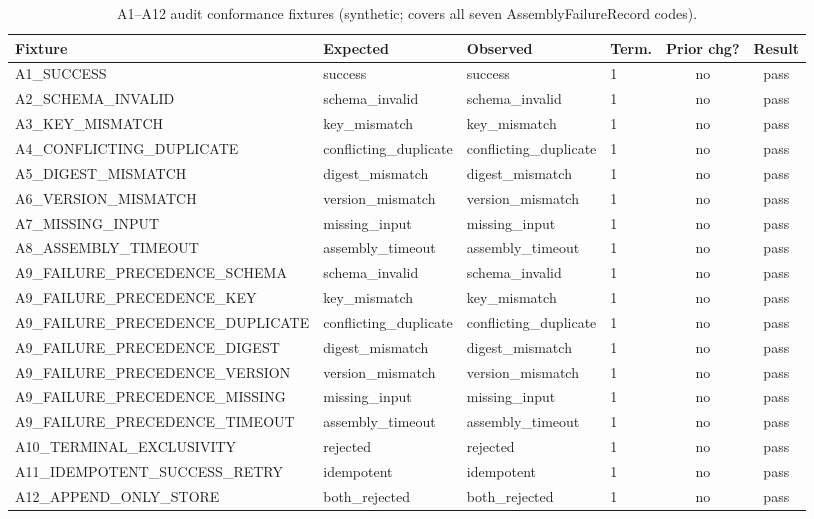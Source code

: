 \begin{table}[!t]
\caption{A1--A12 audit conformance fixtures (synthetic; covers all seven AssemblyFailureRecord codes).}
\label{tab:audit-a12}
\centering
\scriptsize
\setlength{\tabcolsep}{3pt}
\begin{tabular}{@{}llllcc@{}}
\toprule
\textbf{Fixture} & \textbf{Expected} & \textbf{Observed} & \textbf{Term.} & \textbf{Prior chg?} & \textbf{Result} \\
\midrule
A1\_SUCCESS & success & success & 1 & no & pass \\
A2\_SCHEMA\_INVALID & schema\_invalid & schema\_invalid & 1 & no & pass \\
A3\_KEY\_MISMATCH & key\_mismatch & key\_mismatch & 1 & no & pass \\
A4\_CONFLICTING\_DUPLICATE & conflicting\_duplicate & conflicting\_duplicate & 1 & no & pass \\
A5\_DIGEST\_MISMATCH & digest\_mismatch & digest\_mismatch & 1 & no & pass \\
A6\_VERSION\_MISMATCH & version\_mismatch & version\_mismatch & 1 & no & pass \\
A7\_MISSING\_INPUT & missing\_input & missing\_input & 1 & no & pass \\
A8\_ASSEMBLY\_TIMEOUT & assembly\_timeout & assembly\_timeout & 1 & no & pass \\
A9\_FAILURE\_PRECEDENCE\_SCHEMA & schema\_invalid & schema\_invalid & 1 & no & pass \\
A9\_FAILURE\_PRECEDENCE\_KEY & key\_mismatch & key\_mismatch & 1 & no & pass \\
A9\_FAILURE\_PRECEDENCE\_DUPLICATE & conflicting\_duplicate & conflicting\_duplicate & 1 & no & pass \\
A9\_FAILURE\_PRECEDENCE\_DIGEST & digest\_mismatch & digest\_mismatch & 1 & no & pass \\
A9\_FAILURE\_PRECEDENCE\_VERSION & version\_mismatch & version\_mismatch & 1 & no & pass \\
A9\_FAILURE\_PRECEDENCE\_MISSING & missing\_input & missing\_input & 1 & no & pass \\
A9\_FAILURE\_PRECEDENCE\_TIMEOUT & assembly\_timeout & assembly\_timeout & 1 & no & pass \\
A10\_TERMINAL\_EXCLUSIVITY & rejected & rejected & 1 & no & pass \\
A11\_IDEMPOTENT\_SUCCESS\_RETRY & idempotent & idempotent & 1 & no & pass \\
A12\_APPEND\_ONLY\_STORE & both\_rejected & both\_rejected & 1 & no & pass \\
\bottomrule
\end{tabular}
\end{table}
